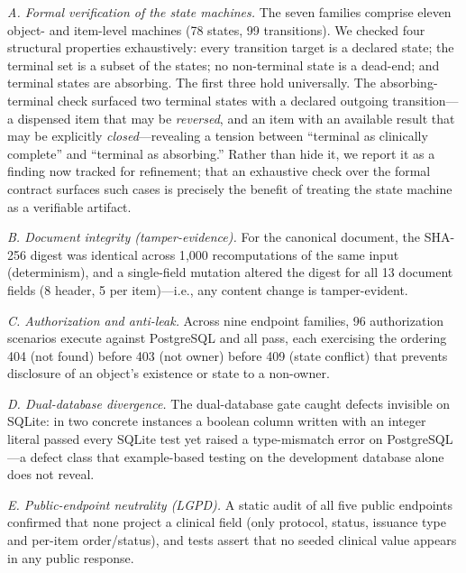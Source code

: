 \documentclass[conference]{IEEEtran}
\begin{document}
\textit{A. Formal verification of the state machines.} The seven families comprise eleven object- and item-level machines (78 states, 99 transitions). We checked four structural properties exhaustively: every transition target is a declared state; the terminal set is a subset of the states; no non-terminal state is a dead-end; and terminal states are absorbing. The first three hold universally. The absorbing-terminal check surfaced two terminal states with a declared outgoing transition---a dispensed item that may be \emph{reversed}, and an item with an available result that may be explicitly \emph{closed}---revealing a tension between ``terminal as clinically complete'' and ``terminal as absorbing.'' Rather than hide it, we report it as a finding now tracked for refinement; that an exhaustive check over the formal contract surfaces such cases is precisely the benefit of treating the state machine as a verifiable artifact.

\textit{B. Document integrity (tamper-evidence).} For the canonical document, the SHA-256 digest was identical across 1{,}000 recomputations of the same input (determinism), and a single-field mutation altered the digest for all 13 document fields (8 header, 5 per item)---i.e., any content change is tamper-evident.

\textit{C. Authorization and anti-leak.} Across nine endpoint families, 96 authorization scenarios execute against PostgreSQL and all pass, each exercising the ordering 404 (not found) before 403 (not owner) before 409 (state conflict) that prevents disclosure of an object's existence or state to a non-owner.

\textit{D. Dual-database divergence.} The dual-database gate caught defects invisible on SQLite: in two concrete instances a boolean column written with an integer literal passed every SQLite test yet raised a type-mismatch error on PostgreSQL---a defect class that example-based testing on the development database alone does not reveal.

\textit{E. Public-endpoint neutrality (LGPD).} A static audit of all five public endpoints confirmed that none project a clinical field (only protocol, status, issuance type and per-item order/status), and tests assert that no seeded clinical value appears in any public response.
\end{document}
